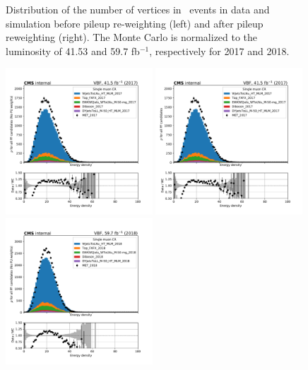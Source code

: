 \begin{figure}[ht!]
\begin{center}
    \caption{
        Distribution of the number of vertices in \Wmn~events in data and
        simulation before pileup re-weighting (left) and after pileup reweighting (right).
        The Monte Carlo is normalized to the luminosity of 41.53 and 59.7 fb$^{-1}$, respectively for 2017 and 2018.
    }
    \label{fig:purwt_npv}
  \end{center}
\end{figure}

\begin{figure}[ht!]
  \begin{center}
    \includegraphics[width=0.49\textwidth]{Pileup/cr_1m_vbf_rho_all_nopu_2017.pdf}
    \includegraphics[width=0.49\textwidth]{Pileup/cr_1m_vbf_rho_all_2017.pdf}
    \includegraphics[width=0.49\textwidth]{Pileup/cr_1m_vbf_rho_all_nopu_2018.pdf}

\end{center}
\end{figure}
